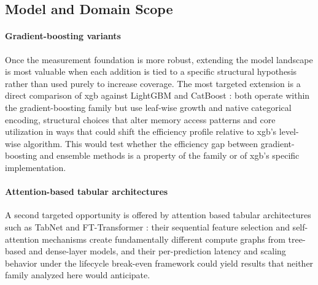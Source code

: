 \subsection{Model and Domain Scope}

\paragraph{Gradient-boosting variants}
Once the measurement foundation is more robust, extending the model landscape is most valuable when each addition is tied to a specific structural hypothesis rather than used purely to increase coverage. The most targeted extension is a direct comparison of \gls{xgb} against LightGBM \cite{keLightGBMHighlyEfficient2017} and CatBoost \cite{prokhorenkovaCatBoostUnbiasedBoosting2018}: both operate within the gradient-boosting family but use leaf-wise growth and native categorical encoding, structural choices that alter memory access patterns and core utilization in ways that could shift the efficiency profile relative to \gls{xgb}'s level-wise algorithm. This would test whether the efficiency gap between gradient-boosting and ensemble methods is a property of the family or of \gls{xgb}'s specific implementation.

\paragraph{Attention-based tabular architectures}
A second targeted opportunity is offered by attention based tabular architectures such as TabNet \cite{arikTabNetAttentiveInterpretable2021} and FT-Transformer \cite{gorishniyRevisitingDeepLearning2021a}: their sequential feature selection and self-attention mechanisms create fundamentally different compute graphs from tree-based and dense-layer models, and their per-prediction latency and scaling behavior under the lifecycle break-even framework could yield results that neither family analyzed here would anticipate.

